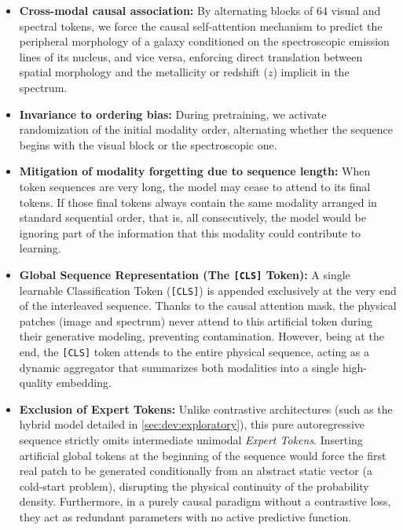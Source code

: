 \begin{itemize}
\item \textbf{Cross-modal causal association:} By alternating blocks of 64 visual and spectral tokens, we force the causal self-attention mechanism to predict the peripheral morphology of a galaxy conditioned on the spectroscopic emission lines of its nucleus, and vice versa, enforcing direct translation between spatial morphology and the metallicity or redshift ($z$) implicit in the spectrum.

\item \textbf{Invariance to ordering bias:} During pretraining, we activate randomization of the initial modality order, alternating whether the sequence begins with the visual block or the spectroscopic one.

\item \textbf{Mitigation of modality forgetting due to sequence length:} When token sequences are very long, the model may cease to attend to its final tokens. If those final tokens always contain the same modality arranged in standard sequential order, that is, all consecutively, the model would be ignoring part of the information that this modality could contribute to learning.

\item \textbf{Global Sequence Representation (The \texttt{[CLS]} Token):} A single learnable Classification Token (\texttt{[CLS]}) is appended exclusively at the very end of the interleaved sequence. Thanks to the causal attention mask, the physical patches (image and spectrum) never attend to this artificial token during their generative modeling, preventing contamination. However, being at the end, the \texttt{[CLS]} token attends to the entire physical sequence, acting as a dynamic aggregator that summarizes both modalities into a single high-quality embedding.

\item \textbf{Exclusion of Expert Tokens:} Unlike contrastive architectures (such as the hybrid model detailed in \cref{sec:dev:exploratory}), this pure autoregressive sequence strictly omits intermediate unimodal \textit{Expert Tokens}. Inserting artificial global tokens at the beginning of the sequence would force the first real patch to be generated conditionally from an abstract static vector (a cold-start problem), disrupting the physical continuity of the probability density. Furthermore, in a purely causal paradigm without a contrastive loss, they act as redundant parameters with no active predictive function.
\end{itemize}


